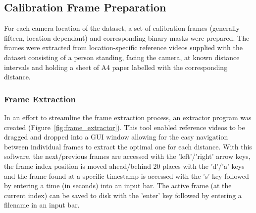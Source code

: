 \subsection{Calibration Frame Preparation}

For each camera location of the dataset, a set of calibration frames (generally fifteen,
location dependant) and corresponding binary masks were prepared.
The frames were extracted from location-specific reference videos supplied with the dataset
consisting of a person standing, facing the camera, at known distance intervals
and holding a sheet of A4 paper labelled with the corresponding distance.

\subsubsection{Frame Extraction}
In an effort to streamline the frame extraction process, an extractor program was created
(Figure~\ref{fig:frame_extractor}).
This tool enabled reference videos to be dragged and dropped into a GUI window allowing for the
easy navigation between individual frames to extract the optimal one for each distance.
With this software, the next/previous frames are accessed with the 'left'/'right' arrow keys, the frame
index position is moved ahead/behind 20 places with the 'd'/'a' keys and the frame found at a specific
timestamp is accessed with the 's' key followed by entering a time (in seconds) into an input bar.
The active frame (at the current index) can be saved to disk with the 'enter' key followed by entering
a filename in an input bar.
\vspace{5mm}


